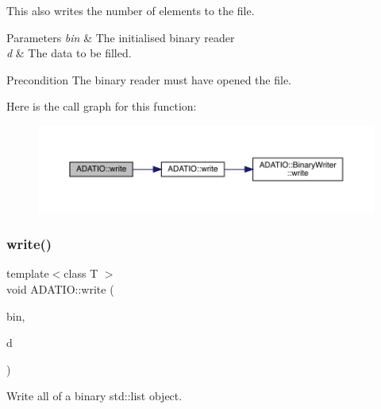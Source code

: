 This also writes the number of elements to the file. 
\begin{DoxyParams}{Parameters}
{\em bin} & The initialised binary reader \\
\hline
{\em d} & The data to be filled.\\
\hline
\end{DoxyParams}
\begin{DoxyPrecond}{Precondition}
The binary reader must have opened the file. 
\end{DoxyPrecond}
Here is the call graph for this function\+:\nopagebreak
\begin{figure}[H]
\begin{center}
\leavevmode
\includegraphics[width=350pt]{d0/dba/namespaceADATIO_a588c700d58adcb2b77399ac18ec9226b_cgraph}
\end{center}
\end{figure}
\mbox{\label{namespaceADATIO_a940fb003df0f6107d020341f78592201}} 
\subsubsection{\texorpdfstring{write()}{write()}\hspace{0.1cm}{\footnotesize\ttfamily [22/25]}}
{\footnotesize\ttfamily template$<$class T $>$ \\
void A\+D\+A\+T\+I\+O\+::write (\begin{DoxyParamCaption}\item[{\mbox{\hyperlink{classADATIO_1_1BinaryWriter}{Binary\+Writer}} \&}]{bin,  }\item[{const std\+::list$<$ T $>$ \&}]{d }\end{DoxyParamCaption})\hspace{0.3cm}{\ttfamily [inline]}}



Write all of a binary std\+::list object. 

